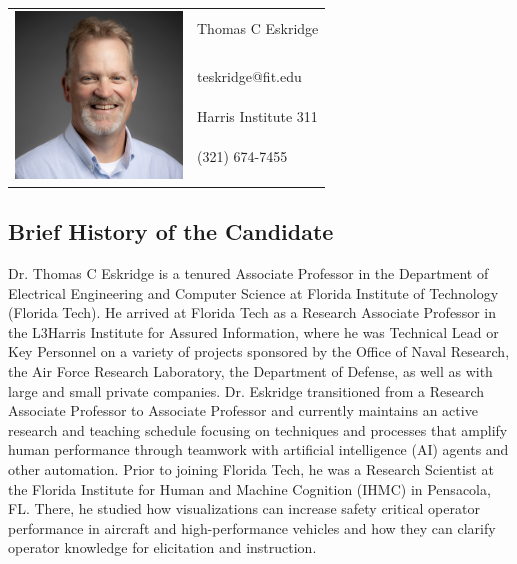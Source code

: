 \documentclass[12pt,letterpaper]{report}
\begin{document}
    \raggedright{}

\begin{tabular}{ c l }
  \multirow{6}{*}{\includegraphics[height=1.75in]{img/headshot.jpeg}} & \large Thomas C Eskridge \\\\
  & \large teskridge@fit.edu \\
  & \large Harris Institute 311 \\
  & \large (321) 674-7455 \\
  & \vspace{20mm}\\
\end{tabular}


\subsection*{Brief History of the Candidate}

Dr. Thomas C Eskridge is a tenured Associate Professor in the Department of Electrical Engineering and Computer Science at Florida Institute of Technology (Florida Tech).  He arrived at Florida Tech as a Research Associate Professor in the L3Harris Institute for Assured Information, where he was Technical Lead or Key Personnel on a variety of projects sponsored by the Office of Naval Research, the Air Force Research Laboratory, the Department of Defense, as well as with large and small private companies.  Dr. Eskridge transitioned from a Research Associate Professor to Associate Professor and currently maintains an active research and teaching schedule focusing on techniques and processes that amplify human performance through teamwork with artificial intelligence (AI) agents and other automation.  Prior to joining Florida Tech, he was a Research Scientist at the Florida Institute for Human and Machine Cognition (IHMC) in Pensacola, FL.  There, he studied how visualizations can increase safety critical operator performance in aircraft and high-performance vehicles and how they can clarify operator knowledge for elicitation and instruction.  
\end{document}
